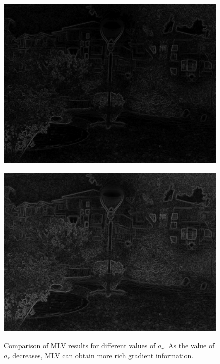 \begin{figure}[t]
\centering
\begin{minipage}[b]{0.49\hsize}
\centering
\includegraphics[height=0.55\hsize]{images/noise/MLV_10.eps}
 \label{fig:mlv_normal}
\end{minipage}
\begin{minipage}[b]{0.49\hsize}
\centering
\includegraphics[height=0.55\hsize]{images/noise/MLV_05.eps}
 \label{fig:mlv_pow}
\end{minipage}
\caption{Comparison of MLV results for different values of $a_{r}$. As the value of $a_{r}$ decreases, MLV can obtain more rich gradient information.}
\label{fig:mlv_change}
\end{figure}

